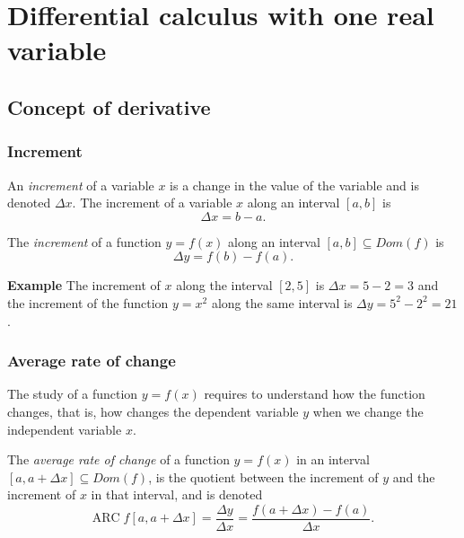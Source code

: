 \section{Differential calculus with one real variable}


\subsection{Concept of derivative}
\begin{frame}
\frametitle{Increment}
\begin{definition}
An \emph{increment} of a variable $x$ is a change in the value of the variable and is denoted $\Delta x$.
The increment of a variable $x$ along an interval $[a,b]$ is
\[
\Delta x = b-a.
\]
\end{definition}

\begin{definition}
The \emph{increment} of a function $y=f(x)$ along an interval $[a,b]\subseteq Dom(f)$ is
\[
\Delta y = f(b)-f(a).
\]
\end{definition}

\textbf{Example} The increment of $x$ along the interval $[2,5]$ is $\Delta x=5-2=3$ and the increment of the function $y=x^2$ along the same interval is $\Delta y=5^2-2^2=21$.
\end{frame}

\begin{frame}
\frametitle{Average rate of change}
The study of a function $y=f(x)$ requires to understand how the function changes, that is, how changes the dependent variable $y$ when we change the independent variable $x$.

\begin{definition}
The  \emph{average rate of change} of a function $y=f(x)$ in an interval $[a,a+\Delta x]\subseteq Dom(f)$, is the quotient between the increment of $y$ and the increment of $x$ in that interval, and is denoted
\[
\mbox{ARC}\;f[a,a+\Delta x]=\frac{\Delta y}{\Delta x}=\frac{f(a+\Delta x)-f(a)}{\Delta x}.
\]
\end{definition}
\end{frame}

